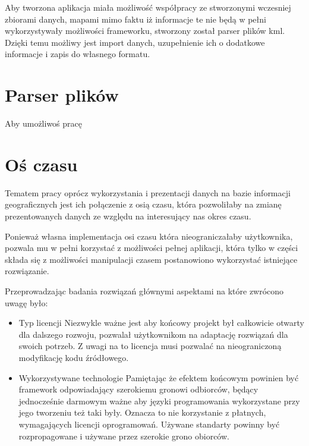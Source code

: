 Aby tworzona aplikacja miała możliwość współpracy ze stworzonymi wczesniej zbiorami danych, mapami mimo faktu iż informacje te nie będą w pełni wykorzystywały możliwości frameworku, stworzony został parser plików kml. Dzięki temu możliwy jest import danych, uzupełnienie ich o dodatkowe informacje i zapis do własnego formatu.

\section{Parser plików}
\label{sec:parser}

Aby umożliwoś pracę 

\section{Oś czasu}
\label{sec:timeLine}

Tematem pracy oprócz wykorzystania i prezentacji danych na bazie informacji geograficznych jest ich połączenie z osią czasu, która pozwoliłaby na zmianę prezentowanych danych ze względu na interesujący nas okres czasu.

Ponieważ własna implementacja osi czasu która nieograniczałaby użytkownika, pozwala mu w pełni korzystać z możliwości pełnej aplikacji, która tylko w części składa się z możliwości manipulacji czasem postanowiono wykorzystać istniejące rozwiązanie.

Przeprowadzając badania rozwiązań głównymi aspektami na które zwrócono uwagę było:

\begin{itemize}

\item

Typ licencji
Niezwykle ważne jest aby końcowy projekt był całkowicie otwarty dla dalszego rozwoju, pozwalał użytkownikom na adaptację rozwiązań dla swoich potrzeb. Z uwagi na to licencja musi pozwalać na nieograniczoną modyfikację kodu źródłowego.

\item

Wykorzystywane technologie
Pamiętając że efektem końcowym powinien być framework odpowiadający szerokiemu gronowi odbiorców, będący jednocześnie darmowym ważne aby języki programowania wykorzystane przy jego tworzeniu też taki były. Oznacza to nie korzystanie z płatnych, wymagających licencji oprogramowań. Używane standarty powinny być rozpropagowane i używane przez szerokie grono obiorców.

\end{itemize}

